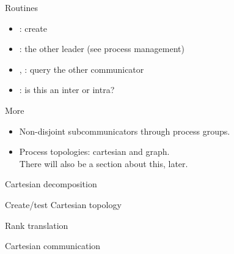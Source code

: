\begin{numberedframe}{Routines}
  \label{sl:intercomm-routines}
  \begin{itemize}
  \item
    : create
  \item {}: the other leader (see process management)
  \item {}, :
    query the other communicator
  \item {}: is this an inter or intra?
  \end{itemize}
\end{numberedframe}

\begin{numberedframe}{More}
  \begin{itemize}
  \item Non-disjoint subcommunicators through process groups.
  \item Process topologies: cartesian and graph.\\
    There will also be a section about this, later.
  \end{itemize}
\end{numberedframe}


\begin{numberedframe}{Cartesian decomposition}
\end{numberedframe}

\begin{numberedframe}{Create/test Cartesian topology}

\end{numberedframe}

\begin{comment}
  \begin{numberedframe}{Topology testing}
    \cverbatimsnippet{carttypetest}  
  \end{numberedframe}
\end{comment}

\begin{numberedframe}{Rank translation}
\end{numberedframe}

\begin{numberedframe}{Cartesian communication}
  \footnotesize
\end{numberedframe}

